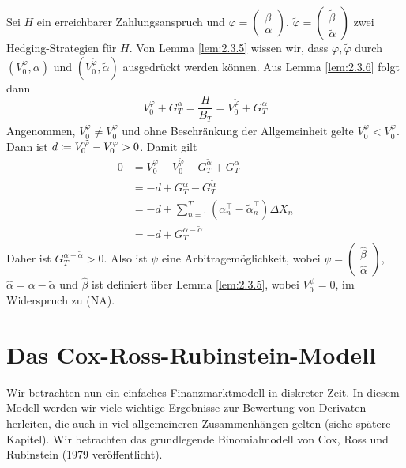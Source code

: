 \documentclass[a4paper,twoside,DIV15,BCOR12mm]{scrbook}
\begin{document}
\begin{beweis}
Sei $H$ ein erreichbarer Zahlungsanspruch und $\varphi =
\left(\begin{smallmatrix} \beta \\ \alpha \end{smallmatrix}\right)$, $\tilde\varphi =
\left(\begin{smallmatrix} \tilde\beta \\ \tilde\alpha \end{smallmatrix}\right)$ zwei Hedging-Strategien für $H$. Von Lemma \ref{lem:2.3.5} wissen wir, dass $\varphi, \tilde\varphi$ durch $(V_0^\varphi,\alpha)$ und $(V_0^{\tilde\varphi},\tilde\alpha)$ ausgedrückt werden können. Aus Lemma \ref{lem:2.3.6} folgt dann
\[
V_0^\varphi + G_T^\alpha = \frac H {B_T} = V_0^{\tilde\varphi} + G_T^{\tilde\alpha}
\]
Angenommen, $V_0^\varphi \ne V_0^{\tilde\varphi}$ und ohne Beschränkung der Allgemeinheit gelte $V_0^\varphi < V_0^{\tilde\varphi}$. Dann ist $d \da V_0^{\tilde{\varphi}} - V_0^{\varphi} > 0$. Damit gilt
\begin{align*}
0 &= V_0^\varphi - V_0^{\tilde\varphi} - G_T^{\tilde\alpha} + G_T^\alpha  \\
&= -d + G_T^\alpha  - G_T^{\tilde\alpha}  \\
&= -d + \sum_{n=1}^T (\alpha_n^\top - \tilde\alpha_n^\top) \Delta X_n \\
&= -d + G_T^{\alpha-\tilde\alpha}
\end{align*}
Daher ist $G_T^{\alpha-\tilde\alpha}>0$. Also ist $\psi$ eine Arbitragemöglichkeit, wobei $\psi = 
\left(\begin{smallmatrix} \hat\beta \\ \hat\alpha \end{smallmatrix}\right)$, $\hat\alpha = \alpha -\tilde\alpha$ und $\hat\beta$ ist definiert über Lemma \ref{lem:2.3.5}, wobei $V_0^\psi=0$, im Widerspruch zu (NA).
\end{beweis}

\section{Das Cox-Ross-Rubinstein-Modell}

Wir betrachten nun ein einfaches  Finanzmarktmodell in diskreter Zeit. In diesem Modell werden wir viele wichtige Ergebnisse zur Bewertung von Derivaten herleiten, die auch in viel allgemeineren Zusammenhängen gelten (siehe spätere Kapitel). Wir betrachten das grundlegende Binomialmodell von Cox, Ross und Rubinstein (1979 veröffentlicht).
\end{document}
